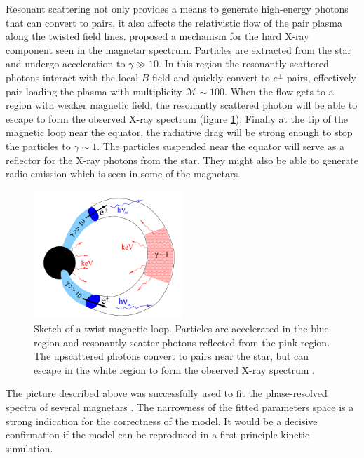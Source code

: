 Resonant scattering not only provides a means to generate high-energy photons
that can convert to pairs, it also affects the relativistic flow of the pair
plasma along the twisted field lines. \citet{beloborodov_mechanism_2013}
proposed a mechanism for the hard X-ray component seen in the magnetar spectrum.
Particles are extracted from the star and undergo acceleration to $\gamma\gg
10$. In this region the resonantly scattered photons interact with the local $B$
field and quickly convert to $e^{\pm}$ pairs, effectively pair loading the
plasma with multiplicity $\mathcal{M}\sim 100$. When the flow gets to a region
with weaker magnetic field, the resonantly scattered photon will be able to
escape to form the observed X-ray spectrum (figure \ref{fig:magnetar-loop}).
Finally at the tip of the magnetic loop near the equator, the radiative drag
will be strong enough to stop the particles to $\gamma \sim 1$. The particles
suspended near the equator will serve as a reflector for the X-ray photons from
the star. They might also be able to generate radio emission which is seen in
some of the magnetars.

\begin{figure}[h]
  \centering
  \includegraphics[width=0.5\textwidth]{pics/intro/magnetar-loop.png}
  \caption[Sketch of a twist magnetic loop.]{Sketch of a twist magnetic loop.
    Particles are accelerated in the blue region and resonantly scatter photons
    reflected from the pink region. The upscattered photons convert to pairs
    near the star, but can escape in the white region to form the observed X-ray
    spectrum \citep{beloborodov_mechanism_2013}.}
  \label{fig:magnetar-loop}
\end{figure}

The picture described above was successfully used to fit the phase-resolved
spectra of several magnetars \citep{hascoet_phase-resolved_2014}. The narrowness
of the fitted parameters space is a strong indication for the correctness of the
model. It would be a decisive confirmation if the model can be reproduced in a
first-principle kinetic simulation.

